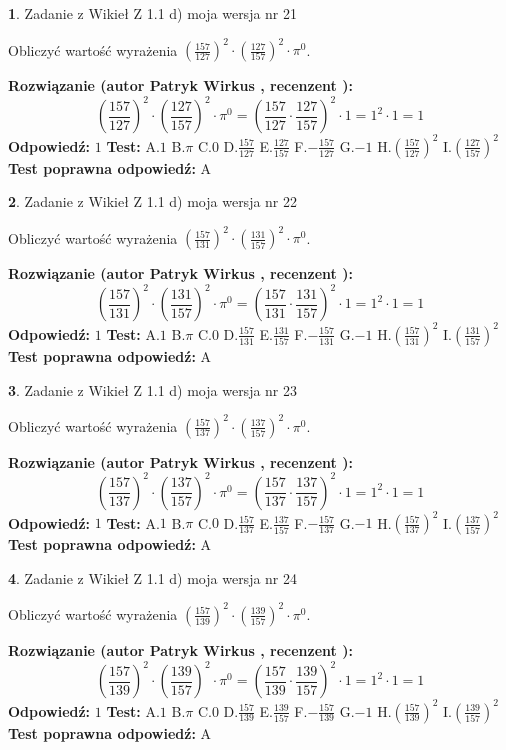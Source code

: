 \documentclass[12pt, a4paper]{article}
\theoremstyle{definition} %
\newtheorem{zad}{}
\newcommand{\zadStart}[1]{\begin{zad}#1\newline}
\newcommand{\zadStop}{\end{zad}}
\newcommand{\rozwStart}[2]{\noindent \textbf{Rozwiązanie (autor #1 , recenzent #2): }\newline}
\newcommand{\rozwStop}{\newline}
\newcommand{\odpStart}{\noindent \textbf{Odpowiedź:}\newline}
\newcommand{\odpStop}{\newline}
\newcommand{\testStart}{\noindent \textbf{Test:}\newline}
\newcommand{\testStop}{\newline}
\newcommand{\kluczStart}{\noindent \textbf{Test poprawna odpowiedź:}\newline}
\newcommand{\kluczStop}{\newline}
\begin{document}
\zadStart{Zadanie z Wikieł Z 1.1 d) moja wersja nr 21}

Obliczyć wartość wyrażenia $(\frac{157}{127})^{2} \cdot (\frac{127}{157})^{2} \cdot \pi^{0}$.
\zadStop
\rozwStart{Patryk Wirkus}{}
$$(\frac{157}{127})^{2} \cdot (\frac{127}{157})^{2} \cdot \pi^{0} = (\frac{157}{127} \cdot \frac{127}{157})^{2} \cdot 1 = 1^{2} \cdot 1 = 1$$
\rozwStop
\odpStart
$1$
\odpStop
\testStart
A.$1$ B.$\pi$ C.$0$ D.$\frac{157}{127}$ E.$\frac{127}{157}$
F.$-\frac{157}{127}$ G.$-1$
H.$(\frac{157}{127})^{2}$
I.$(\frac{127}{157})^{2}$
\testStop
\kluczStart
A
\kluczStop



\zadStart{Zadanie z Wikieł Z 1.1 d) moja wersja nr 22}

Obliczyć wartość wyrażenia $(\frac{157}{131})^{2} \cdot (\frac{131}{157})^{2} \cdot \pi^{0}$.
\zadStop
\rozwStart{Patryk Wirkus}{}
$$(\frac{157}{131})^{2} \cdot (\frac{131}{157})^{2} \cdot \pi^{0} = (\frac{157}{131} \cdot \frac{131}{157})^{2} \cdot 1 = 1^{2} \cdot 1 = 1$$
\rozwStop
\odpStart
$1$
\odpStop
\testStart
A.$1$ B.$\pi$ C.$0$ D.$\frac{157}{131}$ E.$\frac{131}{157}$
F.$-\frac{157}{131}$ G.$-1$
H.$(\frac{157}{131})^{2}$
I.$(\frac{131}{157})^{2}$
\testStop
\kluczStart
A
\kluczStop



\zadStart{Zadanie z Wikieł Z 1.1 d) moja wersja nr 23}

Obliczyć wartość wyrażenia $(\frac{157}{137})^{2} \cdot (\frac{137}{157})^{2} \cdot \pi^{0}$.
\zadStop
\rozwStart{Patryk Wirkus}{}
$$(\frac{157}{137})^{2} \cdot (\frac{137}{157})^{2} \cdot \pi^{0} = (\frac{157}{137} \cdot \frac{137}{157})^{2} \cdot 1 = 1^{2} \cdot 1 = 1$$
\rozwStop
\odpStart
$1$
\odpStop
\testStart
A.$1$ B.$\pi$ C.$0$ D.$\frac{157}{137}$ E.$\frac{137}{157}$
F.$-\frac{157}{137}$ G.$-1$
H.$(\frac{157}{137})^{2}$
I.$(\frac{137}{157})^{2}$
\testStop
\kluczStart
A
\kluczStop



\zadStart{Zadanie z Wikieł Z 1.1 d) moja wersja nr 24}

Obliczyć wartość wyrażenia $(\frac{157}{139})^{2} \cdot (\frac{139}{157})^{2} \cdot \pi^{0}$.
\zadStop
\rozwStart{Patryk Wirkus}{}
$$(\frac{157}{139})^{2} \cdot (\frac{139}{157})^{2} \cdot \pi^{0} = (\frac{157}{139} \cdot \frac{139}{157})^{2} \cdot 1 = 1^{2} \cdot 1 = 1$$
\rozwStop
\odpStart
$1$
\odpStop
\testStart
A.$1$ B.$\pi$ C.$0$ D.$\frac{157}{139}$ E.$\frac{139}{157}$
F.$-\frac{157}{139}$ G.$-1$
H.$(\frac{157}{139})^{2}$
I.$(\frac{139}{157})^{2}$
\testStop
\kluczStart
A
\kluczStop
\end{document}
